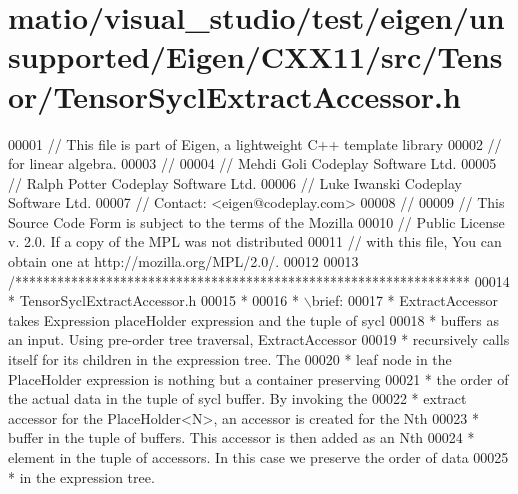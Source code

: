 \hypertarget{matio_2visual__studio_2test_2eigen_2unsupported_2_eigen_2_c_x_x11_2src_2_tensor_2_tensor_sycl_extract_accessor_8h_source}{}\section{matio/visual\+\_\+studio/test/eigen/unsupported/\+Eigen/\+C\+X\+X11/src/\+Tensor/\+Tensor\+Sycl\+Extract\+Accessor.h}
\label{matio_2visual__studio_2test_2eigen_2unsupported_2_eigen_2_c_x_x11_2src_2_tensor_2_tensor_sycl_extract_accessor_8h_source}

\begin{DoxyCode}
00001 \textcolor{comment}{// This file is part of Eigen, a lightweight C++ template library}
00002 \textcolor{comment}{// for linear algebra.}
00003 \textcolor{comment}{//}
00004 \textcolor{comment}{// Mehdi Goli    Codeplay Software Ltd.}
00005 \textcolor{comment}{// Ralph Potter  Codeplay Software Ltd.}
00006 \textcolor{comment}{// Luke Iwanski  Codeplay Software Ltd.}
00007 \textcolor{comment}{// Contact: <eigen@codeplay.com>}
00008 \textcolor{comment}{//}
00009 \textcolor{comment}{// This Source Code Form is subject to the terms of the Mozilla}
00010 \textcolor{comment}{// Public License v. 2.0. If a copy of the MPL was not distributed}
00011 \textcolor{comment}{// with this file, You can obtain one at http://mozilla.org/MPL/2.0/.}
00012 
00013 \textcolor{comment}{/*****************************************************************}
00014 \textcolor{comment}{ * TensorSyclExtractAccessor.h}
00015 \textcolor{comment}{ *}
00016 \textcolor{comment}{ * \(\backslash\)brief:}
00017 \textcolor{comment}{ * ExtractAccessor takes Expression placeHolder expression and the tuple of sycl}
00018 \textcolor{comment}{ * buffers as an input. Using pre-order tree traversal, ExtractAccessor}
00019 \textcolor{comment}{ * recursively calls itself for its children in the expression tree. The}
00020 \textcolor{comment}{ * leaf node in the PlaceHolder expression is nothing but a container preserving}
00021 \textcolor{comment}{ * the order of the actual data in the tuple of sycl buffer. By invoking the}
00022 \textcolor{comment}{ * extract accessor for the PlaceHolder<N>, an accessor is created for the Nth}
00023 \textcolor{comment}{ * buffer in the tuple of buffers. This accessor is then added as an Nth}
00024 \textcolor{comment}{ * element in the tuple of accessors. In this case we preserve the order of data}
00025 \textcolor{comment}{ * in the expression tree.}

\end{DoxyCode}
